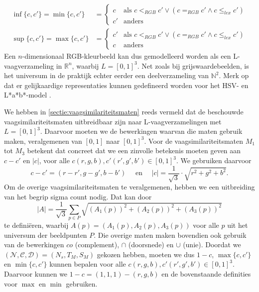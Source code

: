 \begin{align*}
\inf \{c,c'\} = \min \{c,c'\} &= \begin{cases}
c & \textrm{als } c <_{RGB} c' \lor (c =_{RGB} c' \land c \leq_{lex} c') \\
c' & \textrm{anders}
\end{cases} \\
\sup \{c,c'\} = \max \{c,c'\} & = \begin{cases}
c' & \textrm{als } c <_{RGB} c' \lor (c =_{RGB} c' \land c \leq_{lex} c') \\
c & \textrm{anders}
\end{cases}
\end{align*}
Een $n$-dimensionaal RGB-kleurbeeld kan dus gemodelleerd worden als een L-vaagverzameling in 
$\mathbb{R}^n$, waarbij $L=[0,1]^3$. Net zoals bij grijswaardebeelden, is 
het universum in de praktijk echter eerder een deelverzameling van $\mathbb{N}^2$.
Merk op dat er gelijkaardige representaties kunnen gedefineerd worden voor het HSV- en L*a*b*-model
\cite{vanderweken:construction_of_quality_measures}.

We hebben in \ref{sectie:vaagsimilariteitsmaten} reeds vermeld dat de beschouwde 
vaagsimilariteitsmaten uitbreidbaar zijn naar L-vaag\-ver\-za\-me\-ling\-en met
$L=[0,1]^3$. Daarvoor moeten we de bewerkingen waarvan die maten gebruik maken, veralgemenen van 
$[0,1]$ naar $[0,1]^3$. 
Voor de vaagsimilariteitsmaten $M_1$ tot $M_3$ betekent dat concreet dat we een zinvolle betekenis 
moeten geven aan $c - c'$ en $|c|$, voor alle $c(r,g,b),c'(r',g',b') \in [0,1]^3$. We gebruiken
daarvoor 
\begin{displaymath}
c - c' = (r-r',g-g',b-b') \quad \textrm{ en } \quad |c| = \frac{1}{\sqrt{3}} \cdot \sqrt{r^2 + g^2 + b^2}.
\end{displaymath}
Om de overige vaagsimilariteitsmaten te veralgemenen, hebben we een uitbreiding van het
begrip sigma count nodig. Dat kan door
\begin{displaymath}
|A|=\frac{1}{\sqrt{3}}\sum_{p \in P}\sqrt{(A_1(p))^2+(A_2(p))^2+(A_3(p))^2}
\end{displaymath}
te defini\"eren, waarbij $A(p)=(A_1(p),A_2(p),A_3(p))$ voor alle $p$ uit het
universum der beeldpunten $P$. Die overige maten maken 
bovendien ook gebruik van de bewerkingen $co$ (complement), 
$\cap$ (doorsnede) en $\cup$ (unie). Doordat we 
$(\mathcal{N},\mathcal{C},\mathcal{D})=(N_s,T_M,S_M)$ gekozen hebben, moeten we
dus $1 - c$, $\max \{c,c'\}$ en $\min \{c,c'\}$ kunnen bepalen voor alle 
$c(r,g,b),c'(r',g',b') \in [0,1]^3$. Daarvoor kunnen we $1 - c = (1,1,1) - (r,g,b)$ en de
bovenstaande definities voor $\max$ en $\min$ gebruiken.

